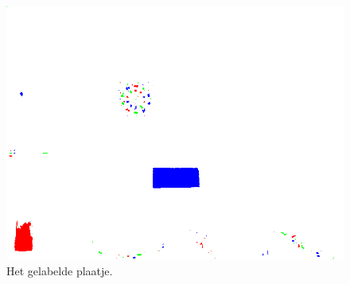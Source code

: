 \begin{figure}
    \begin{center}
        \includegraphics[scale=0.35]{figures/vision/labeled.png}
    \end{center}
    \caption{Het gelabelde plaatje.}
    \label{fig:labelBlobs}
\end{figure}
